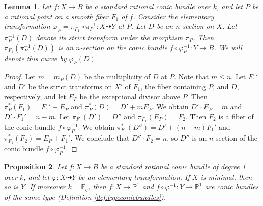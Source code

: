 \documentclass[a4paper, 11pt, reqno]{amsart}
\numberwithin{equation}{section} \numberwithin{figure}{section}
\def \F {{\mathbb F}}
\def \P {{\mathbb P}}
\newcommand{\ra}{\rightarrow}
\newtheorem{lemma}{Lemma}
\newtheorem{proposition}[lemma]{Proposition}
\theoremstyle{definition}
\numberwithin{lemma}{section}
\begin{document}
\begin{lemma}\label{lem:nsection}
    Let $f \colon X \ra B$ be a standard rational conic bundle over $k$, and let $P$ be a rational point on a smooth fiber $F_1$ of $f$. Consider the elementary transformation $\varphi_{\scriptscriptstyle P} = \pi_{F_1} \circ \pi_P^{-1} \colon X \dashrightarrow Y$ at $P$. Let $D$ be an $n$-section on $X$. Let $\pi_P^{-1}(D)$ denote its strict transform under the morphism $\pi_P$. Then $\pi_{F_1}(\pi_P^{-1}(D))$ is an $n$-section on the conic bundle $f \circ \varphi_{\scriptscriptstyle P}^{-1} \colon Y \ra B$. We will denote this curve by $\varphi_{\scriptscriptstyle P}(D)$.
\end{lemma}

\begin{proof}
    Let $m = m_P(D)$ be the multiplicity of $D$ at $P$. Note that $m \leq n$. Let $F_1'$ and $D'$ be the strict transforms on $X'$ of $F_1$, the fiber containing $P$, and $D$, respectively, and let $E_P$ be the exceptional divisor above $P$. Then $\pi_P^*(F_1) = F_1' + E_P$ and $\pi_P^*(D) = D' + m E_P$. We obtain $D' \cdot E_P = m$ and $D' \cdot F_1' = n - m$. Let $\pi_{F_1}(D') = D''$ and $\pi_{F_1}(E_P) = F_2$. Then $F_2$ is a fiber of the conic bundle $f \circ \varphi_{\scriptscriptstyle P}^{-1}$. We obtain $\pi_{F_1}^*(D'') = D' + (n-m) F_1'$ and $\pi_{F_1}^*(F_2) = E_P + F_1'$. We conclude that $D'' \cdot F_2 = n$, so $D''$ is an $n$-section of the conic bundle $f \circ \varphi_{\scriptscriptstyle P}^{-1}$.
\end{proof}

\begin{proposition}\label{prop:preserveminimaltype}
    Let $f \colon X \ra B$ be a standard rational conic bundle of degree 1 over $k$, and let $\varphi \colon X \dashrightarrow Y$ be an elementary transformation. If $X$ is minimal, then so is $Y$. If moreover $k = \F_q$, then $f \colon X \ra \P^1$ and $f \circ \varphi^{-1} \colon Y \ra \P^1$ are conic bundles of the same type (Definition \ref{def:typeconicbundles}).
\end{proposition}
\end{document}
